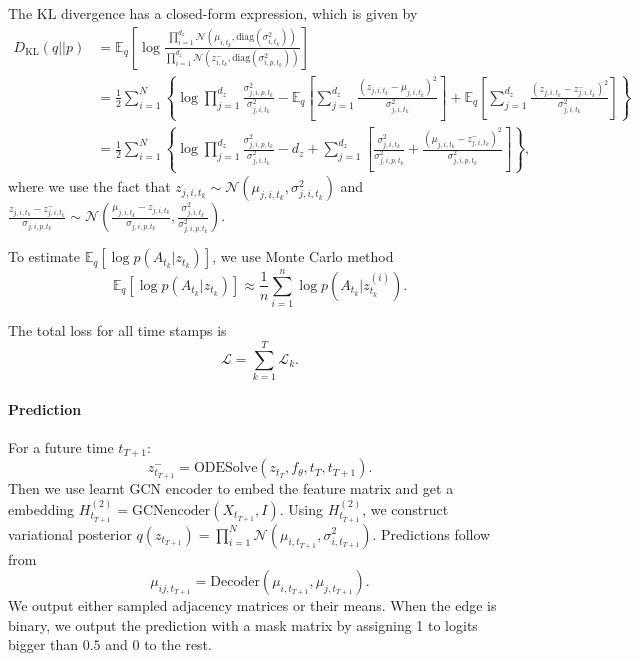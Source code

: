 The KL divergence has a closed-form expression, which is given by
\begin{align*}
    D_{\mathrm{KL}}(q||p) &= \mathbb{E}_{q}\left[\log\frac{\prod_{i=1}^{d_z}\mathcal{N}(\mu_{i,t_k},\mathrm{diag}(\sigma^2_{i,t_k}))}{\prod_{i=1}^{d_z}\mathcal{N}(z^-_{i,t_k},\mathrm{diag}(\sigma^2_{i,p,t_k}))}\right] \\
                          &= \frac{1}{2}\sum_{i=1}^{N}\left\{\log\prod_{j=1}^{d_z}\frac{\sigma^2_{j,i,p,t_k}}{\sigma^2_{j,i,t_k}} -\mathbb{E}_{q}\left[\sum_{j=1}^{d_z}\frac{(z_{j,i,t_k}-\mu_{j,i,t_k})^2}{\sigma^2_{j,i,t_k}}\right] + \mathbb{E}_{q}\left[\sum_{j=1}^{d_z}\frac{(z_{j,i,t_k}-z^-_{j,i,t_k})^2}{\sigma^2_{j,i,t_k}}\right]\right\} \\
                          &= \frac{1}{2}\sum_{i=1}^{N}\left\{\log\prod_{j=1}^{d_z}\frac{\sigma^2_{j,i,p,t_k}}{\sigma^2_{j,i,t_k}} -d_z + \sum_{j=1}^{d_z}\left[\frac{\sigma^2_{j,i,t_k}}{\sigma^2_{j,i,p,t_k}}+\frac{(\mu_{j,i,t_k}-z^-_{j,i,t_k})^2}{\sigma^2_{j,i,p,t_k}}\right]\right\}, 
\end{align*}
where we use the fact that $z_{j,i,t_k}\sim\mathcal{N}(\mu_{j,i,t_k},\sigma^2_{j,i,t_k})$ and $\frac{z_{j,i,t_k}-z^-_{j,i,t_k}}{\sigma_{j,i,p,t_k}}\sim\mathcal{N}(\frac{\mu_{j,i,t_k}-z_{j,i,t_k}}{\sigma_{j,i,p,t_k}},\frac{\sigma^2_{j,i,t_k}}{\sigma^2_{j,i,p,t_k}})$. 

To estimate $\mathbb{E}_{q}[\log p(A_{t_k}|z_{t_k})]$, we use Monte Carlo method 
\begin{equation*}
    \mathbb{E}_{q}[\log p(A_{t_k}|z_{t_k})] \approx \frac{1}{n}\sum_{i=1}^{n}\log p(A_{t_k}|z^{(i)}_{t_k}). 
\end{equation*}

The total loss for all time stamps is
\begin{equation*}
    \mathcal{L}=\sum_{k=1}^T \mathcal{L}_k.
\end{equation*}

\paragraph{Prediction}

For a future time $t_{T+1}$:
\begin{equation*}
    z_{t_{T+1}}^- = \mathrm{ODESolve}(z_{t_T}, f_\theta, t_T, t_{T+1}). 
\end{equation*}
Then we use learnt GCN encoder to embed the feature matrix and get a embedding $H^{(2)}_{t_{T+1}}=\mathrm{GCNencoder}(X_{t_{T+1}}, I)$. 
Using $H^{(2)}_{t_{T+1}}$, we construct variational posterior $q(z_{t_{T+1}})=\prod_{i=1}^{N}\mathcal{N}(\mu_{i,t_{T+1}},\sigma^2_{i,t_{T+1}})$. 
Predictions follow from
\begin{equation*}
    \mu_{ij,t_{T+1}} = \mathrm{Decoder}(\mu_{i,t_{T+1}}, \mu_{j,t_{T+1}}).
\end{equation*}
We output either sampled adjacency matrices or their means. 
When the edge is binary, we output the prediction with a mask matrix by assigning 1 to logits bigger than $0.5$ and 0 to the rest.

